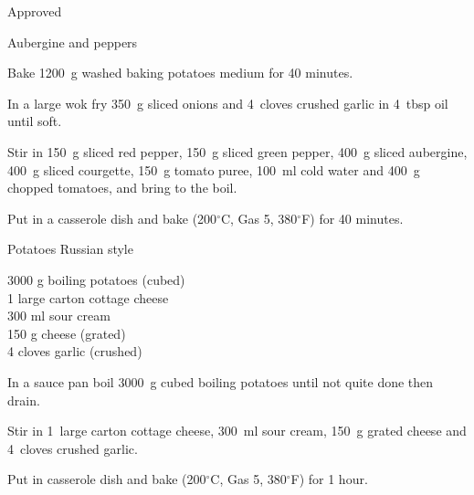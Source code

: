 \begin{menu}{Approved}
\begin{recipe}{2}{Aubergine and peppers}
\begin{ingredients}
		\end{ingredients}
	
    \begin{instructions}
    \item 
      Bake 1200~g washed baking potatoes
      medium for 40 minutes.
    \item 
        In a large wok fry
        350~g sliced onions
        and
        4~cloves crushed garlic
        in
        4~tbsp  oil
        until soft.
      \item 
        Stir in
        150~g sliced red pepper,
        150~g sliced green pepper,
        400~g sliced aubergine,
        400~g sliced courgette,
        150~g  tomato puree,
        100~ml  cold water
        and
        400~g chopped tomatoes,
        and bring to the boil.
      \item 
        Put in a casserole dish and bake 
      (200$^{\circ}$C, Gas 5, 380$^{\circ}$F)
     for 40 minutes.
      
    \end{instructions}
    \end{recipe}%
  
    \begin{recipe}{2}{Potatoes Russian style}%
    
		\begin{ingredients}
		3000 g boiling potatoes (cubed) \\
	1 large carton cottage cheese  \\
	300 ml sour cream  \\
	150 g cheese (grated) \\
	4 cloves garlic (crushed) \\
	
		\end{ingredients}
	
	
    \begin{instructions}
    \item 
        In a sauce pan boil
        3000~g cubed boiling potatoes
        until not quite done
        then drain.
      \item 
        Stir in
        1~large carton  cottage cheese,
        300~ml  sour cream,
        150~g grated cheese
        and
        4~cloves crushed garlic.
      \item 
        Put in casserole dish and bake 
      (200$^{\circ}$C, Gas 5, 380$^{\circ}$F)
     for 1 hour.
      

\end{instructions}
\end{recipe}
\end{menu}

